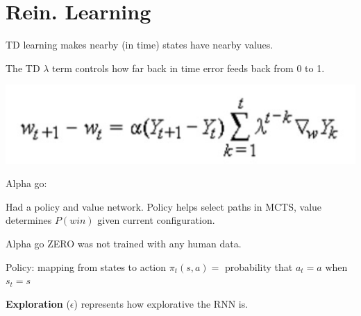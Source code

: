 \section{Rein. Learning}


TD learning makes nearby (in time) states have nearby values.

The TD $\lambda$ term controls how far back in time error feeds back from 0 to 1.

\includegraphics[width=0.9\columnwidth]{images/td}

Alpha go:

Had a policy and value network. Policy helps select paths in MCTS, value determines
$P(win)$ given current configuration.

Alpha go ZERO was not trained with any human data.

Policy: mapping from states to action $\pi_t(s,a) =$ probability that $a_t = a$ when $s_t = s$

\textbf{Exploration} ($\epsilon$) represents how explorative the RNN is.
